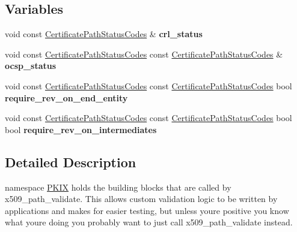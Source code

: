 \subsection*{Variables}
\begin{DoxyCompactItemize}
\item 
\mbox{\label{namespace_botan_1_1_p_k_i_x_a44fb410b4f57b3cb8cbf7cfb31ce9a24}} 
void const \mbox{\hyperlink{namespace_botan_a013252aabcb201e0d27b60b1e690886b}{Certificate\+Path\+Status\+Codes}} \& {\bfseries crl\+\_\+status}
\item 
\mbox{\label{namespace_botan_1_1_p_k_i_x_abd1a7e92082beda13ef61dd3bc2cb220}} 
void const \mbox{\hyperlink{namespace_botan_a013252aabcb201e0d27b60b1e690886b}{Certificate\+Path\+Status\+Codes}} const \mbox{\hyperlink{namespace_botan_a013252aabcb201e0d27b60b1e690886b}{Certificate\+Path\+Status\+Codes}} \& {\bfseries ocsp\+\_\+status}
\item 
\mbox{\label{namespace_botan_1_1_p_k_i_x_ab7a891ad4c6e2a83e1cdd7bf4be0d532}} 
void const \mbox{\hyperlink{namespace_botan_a013252aabcb201e0d27b60b1e690886b}{Certificate\+Path\+Status\+Codes}} const \mbox{\hyperlink{namespace_botan_a013252aabcb201e0d27b60b1e690886b}{Certificate\+Path\+Status\+Codes}} bool {\bfseries require\+\_\+rev\+\_\+on\+\_\+end\+\_\+entity}
\item 
\mbox{\label{namespace_botan_1_1_p_k_i_x_a7693a8b765b069367dd8f2c8cbc4b2d0}} 
void const \mbox{\hyperlink{namespace_botan_a013252aabcb201e0d27b60b1e690886b}{Certificate\+Path\+Status\+Codes}} const \mbox{\hyperlink{namespace_botan_a013252aabcb201e0d27b60b1e690886b}{Certificate\+Path\+Status\+Codes}} bool bool {\bfseries require\+\_\+rev\+\_\+on\+\_\+intermediates}
\end{DoxyCompactItemize}


\subsection{Detailed Description}
namespace \mbox{\hyperlink{namespace_botan_1_1_p_k_i_x}{P\+K\+IX}} holds the building blocks that are called by x509\+\_\+path\+\_\+validate. This allows custom validation logic to be written by applications and makes for easier testing, but unless you\textquotesingle{}re positive you know what you\textquotesingle{}re doing you probably want to just call x509\+\_\+path\+\_\+validate instead. 

